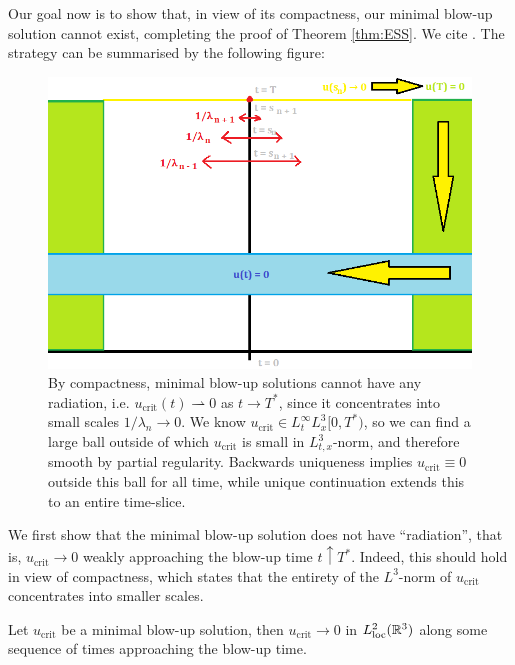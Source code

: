 Our goal now is to show that, in view of its compactness, our minimal blow-up solution cannot exist, completing the proof of Theorem \ref{thm:ESS}. We cite \cite{KenigKoch2011}. The strategy can be summarised by the following figure:


\begin{figure}[h]
	\begin{center}
		\includegraphics[scale = 0.7]{graphics/rigidity}
		\caption{By compactness, minimal blow-up solutions cannot have any radiation, i.e. $u_{\mathrm{crit}}(t) \rightharpoonup 0$ as $t \to T^*$, since it concentrates into small scales $1/\lambda_n \to 0$. We know $u_{\mathrm{crit}} \in L^\infty_t L^3_x [0, T^*)$, so we can find a large ball outside of which $u_{\mathrm{crit}}$ is small in $L^3_{t, x}$-norm, and therefore smooth by partial regularity. Backwards uniqueness implies $u_{\mathrm{crit}} \equiv 0$ outside this ball for all time, while unique continuation extends this to an entire time-slice.  }
	\end{center}\label{fig:1}
\end{figure}

We first show that the minimal blow-up solution does not have ``radiation'', that is, $u_{\mathrm{crit}} \to 0$ weakly approaching the blow-up time $t \uparrow T^*$. Indeed, this should hold in view of compactness, which states that the entirety of the $L^3$-norm of $u_{\mathrm{crit}}$ concentrates into smaller scales. 

\begin{proposition}[No radiation]
	Let $u_{\mathrm{crit}}$ be a minimal blow-up solution, then $u_{\mathrm{crit}} \to 0$ in $L^2_{\mathrm{loc}} (\mathbb R^3)$ along some sequence of times approaching the blow-up time. 
\end{proposition}

